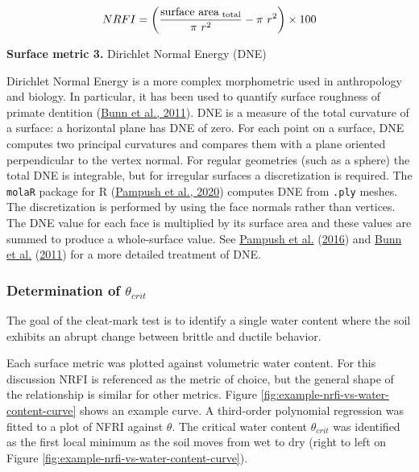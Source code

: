 \documentclass[
  letterpaper,
  openany]{book}
\begin{document}
\begin{equation}
NRFI = \left(\frac{\text{surface area}_{\text{ total}}}{\pi~r^2} - \pi~r^2 \right) \times 100 \\
\label{eq:nrfi-equation} 
\end{equation}

\textbf{Surface metric 3.} Dirichlet Normal Energy (DNE)

Dirichlet Normal Energy is a more complex morphometric used in anthropology and biology.
In particular, it has been used to quantify surface roughness of primate dentition (\protect\hyperlink{ref-Bunn2011}{Bunn et al., 2011}).
DNE is a measure of the total curvature of a surface: a horizontal plane has DNE of zero.
For each point on a surface, DNE computes two principal curvatures and compares them with a plane oriented perpendicular to the vertex normal.
For regular geometries (such as a sphere) the total DNE is integrable, but for irregular surfaces a discretization is required.
The \texttt{molaR} package for R (\protect\hyperlink{ref-Pampush2020}{Pampush et al., 2020}) computes DNE from \texttt{.ply} meshes.
The discretization is performed by using the face normals rather than vertices.
The DNE value for each face is multiplied by its surface area and these values are summed to produce a whole-surface value.
See \protect\hyperlink{ref-Pampush2016}{Pampush et al.} (\protect\hyperlink{ref-Pampush2016}{2016}) and \protect\hyperlink{ref-Bunn2011}{Bunn et al.} (\protect\hyperlink{ref-Bunn2011}{2011}) for a more detailed treatment of DNE.

\hypertarget{determination-of-theta_crit}{%
\subsubsection{\texorpdfstring{Determination of \(\theta_{crit}\)}{Determination of \textbackslash theta\_\{crit\}}}\label{determination-of-theta_crit}}

The goal of the cleat-mark test is to identify a single water content where the soil exhibits an abrupt change between brittle and ductile behavior.

Each surface metric was plotted against volumetric water content.
For this discussion NRFI is referenced as the metric of choice, but the general shape of the relationship is similar for other metrics.
Figure \ref{fig:example-nrfi-vs-water-content-curve} shows an example curve.
A third-order polynomial regression was fitted to a plot of NFRI against \(\theta\).
The critical water content \(\theta_{crit}\) was identified as the first local minimum as the soil moves from wet to dry (right to left on Figure \ref{fig:example-nrfi-vs-water-content-curve}).
\end{document}
